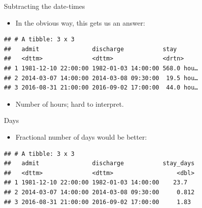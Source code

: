 \documentclass[ignorenonframetext,]{beamer}
\newenvironment{Shaded}{\begin{snugshade}}{\end{snugshade}}
\newcommand{\DataTypeTok}[1]{\textcolor[rgb]{0.13,0.29,0.53}{#1}}
\newcommand{\DecValTok}[1]{\textcolor[rgb]{0.00,0.00,0.81}{#1}}
\newcommand{\KeywordTok}[1]{\textcolor[rgb]{0.13,0.29,0.53}{\textbf{#1}}}
\newcommand{\NormalTok}[1]{#1}
\newcommand{\OperatorTok}[1]{\textcolor[rgb]{0.81,0.36,0.00}{\textbf{#1}}}
\newcommand{\StringTok}[1]{\textcolor[rgb]{0.31,0.60,0.02}{#1}}
\providecommand{\tightlist}{%
  \setlength{\itemsep}{0pt}\setlength{\parskip}{0pt}}
\begin{document}
\begin{frame}[fragile]{Subtracting the date-times}
\protect\hypertarget{subtracting-the-date-times}{}

\begin{itemize}
\tightlist
\item
  In the obvious way, this gets us an answer:
\end{itemize}

\begin{Shaded}
\end{Shaded}

\begin{verbatim}
## # A tibble: 3 x 3
##   admit               discharge           stay      
##   <dttm>              <dttm>              <drtn>    
## 1 1981-12-10 22:00:00 1982-01-03 14:00:00 568.0 hou…
## 2 2014-03-07 14:00:00 2014-03-08 09:30:00  19.5 hou…
## 3 2016-08-31 21:00:00 2016-09-02 17:00:00  44.0 hou…
\end{verbatim}

\begin{itemize}
\tightlist
\item
  Number of hours; hard to interpret.
\end{itemize}

\end{frame}

\begin{frame}[fragile]{Days}
\protect\hypertarget{days}{}

\begin{itemize}
\tightlist
\item
  Fractional number of days would be better:
\end{itemize}

\begin{Shaded}
\end{Shaded}

\begin{verbatim}
## # A tibble: 3 x 3
##   admit               discharge           stay_days
##   <dttm>              <dttm>                  <dbl>
## 1 1981-12-10 22:00:00 1982-01-03 14:00:00    23.7  
## 2 2014-03-07 14:00:00 2014-03-08 09:30:00     0.812
## 3 2016-08-31 21:00:00 2016-09-02 17:00:00     1.83
\end{verbatim}

\end{frame}
\end{document}
